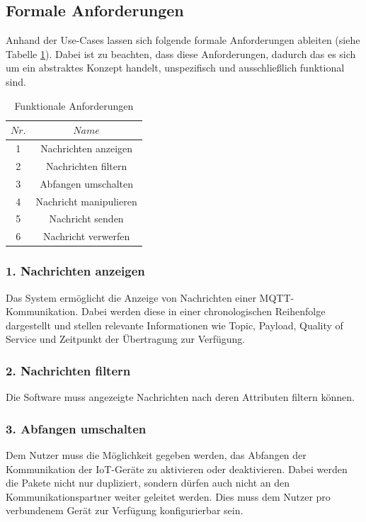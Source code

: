     \subsection{Formale Anforderungen}
    Anhand der Use-Cases lassen sich folgende formale Anforderungen ableiten (siehe Tabelle \ref{tab:functional_requirements}).
    Dabei ist zu beachten, dass diese Anforderungen, dadurch das es sich um ein abstraktes Konzept handelt, unspezifisch und ausschließlich funktional sind.
    \begin{table}[h]
        \centering
        \begin{tabular}{c|c}
            \hline
            $Nr.$ & $Name$ \\ \hline
            1 & Nachrichten anzeigen \\ \hline
            2 & Nachrichten filtern \\ \hline
            3 & Abfangen umschalten \\ \hline
            4 & Nachricht manipulieren \\ \hline
            5 & Nachricht senden \\ \hline
            6 & Nachricht verwerfen \\ \hline
        \end{tabular}
        \caption{Funktionale Anforderungen}
        \label{tab:functional_requirements}
    \end{table}
    
        \subsubsection{1. Nachrichten anzeigen}
        Das System ermöglicht die Anzeige von Nachrichten einer \ac{MQTT}-Kommunikation.
        Dabei werden diese in einer chronologischen Reihenfolge dargestellt und stellen relevante Informationen wie Topic, Payload, Quality of Service und Zeitpunkt der Übertragung zur Verfügung.
        
        \subsubsection{2. Nachrichten filtern}
        Die Software muss angezeigte Nachrichten nach deren Attributen filtern können.
        
        \subsubsection{3. Abfangen umschalten}
        Dem Nutzer muss die Möglichkeit gegeben werden, das Abfangen der  Kommunikation der \ac{IoT}-Geräte zu aktivieren oder deaktivieren.
        Dabei werden die Pakete nicht nur dupliziert, sondern dürfen auch nicht an den Kommunikationspartner weiter geleitet werden.
        Dies muss dem Nutzer pro verbundenem Gerät zur Verfügung konfigurierbar sein.
        
